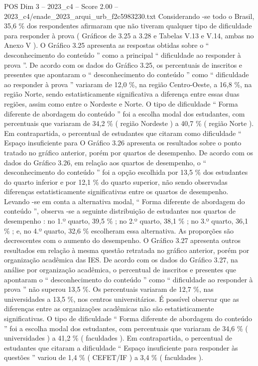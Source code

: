\begin{textsample}{POS Dim 3 – 2023\_c4 – Score 2.00 – 2023\_c4/enade\_2023\_arqui\_urb\_f2c5983230.txt}
Considerando -se todo o Brasil, 35,6 \% dos respondentes afirmaram que não tiveram qualquer tipo de dificuldade para responder à prova ( Gráficos de 3.25 a 3.28 e Tabelas V.13 e V.14, ambas no Anexo V ).
O Gráfico 3.25 apresenta as respostas obtidas sobre o “ desconhecimento do conteúdo ” como a principal “ dificuldade ao responder à prova ”.
De acordo com os dados do Gráfico 3.25, os percentuais de inscritos e presentes que apontaram o “ desconhecimento do conteúdo ” como “ dificuldade ao responder à prova ” variaram de 12,0 \%, na região Centro-Oeste, a 16,8 \%, na região Norte, sendo estatisticamente significativa a diferença entre essas duas regiões, assim como entre o Nordeste e Norte.
O tipo de dificuldade “ Forma diferente de abordagem do conteúdo ” foi a escolha modal dos estudantes, com percentuais que variaram de 34,2 \% ( região Nordeste ) a 40,7 \% ( região Norte ).
Em contrapartida, o percentual de estudantes que citaram como dificuldade “ Espaço insuficiente para O Gráfico 3.26 apresenta os resultados sobre o ponto tratado no gráfico anterior, porém por quartos de desempenho.
De acordo com os dados do Gráfico 3.26, em relação aos quartos de desempenho, o “ desconhecimento do conteúdo ” foi a opção escolhida por 13,5 \% dos estudantes do quarto inferior e por 12,1 \% do quarto superior, não sendo observadas diferenças estatisticamente significativas entre os quartos de desempenho.
Levando -se em conta a alternativa modal, “ Forma diferente de abordagem do conteúdo ”, observa -se a seguinte distribuição de estudantes nos quartos de desempenho : no 1.º quarto, 39,5 \% ; no 2.º quarto, 38,1 \% ; no 3.º quarto, 36,1 \% ; e, no 4.º quarto, 32,6 \% escolheram essa alternativa.
As proporções são decrescentes com o aumento do desempenho.
O Gráfico 3.27 apresenta outros resultados em relação à mesma questão retratada no gráfico anterior, porém por organização acadêmica das IES.
De acordo com os dados do Gráfico 3.27, na análise por organização acadêmica, o percentual de inscritos e presentes que apontaram o “ desconhecimento do conteúdo ” como “ dificuldade ao responder à prova ” não superou 13,5 \%.
Os percentuais variaram de 12,7 \%, nas universidades a 13,5 \%, nos centros universitários.
É possível observar que as diferenças entre as organizações acadêmicas não são estatisticamente significativas.
O tipo de dificuldade “ Forma diferente de abordagem do conteúdo ” foi a escolha modal dos estudantes, com percentuais que variaram de 34,6 \% ( universidades ) a 41,2 \% ( faculdades ).
Em contrapartida, o percentual de estudantes que citaram a dificuldade “ Espaço insuficiente para responder às questões ” variou de 1,4 \% ( CEFET/IF ) a 3,4 \% ( faculdades ).

\end{textsample}
